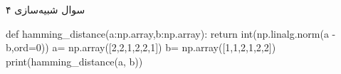سوال شبیه‌سازی ۴

\begin{latin}
\begin{python}
def hamming_distance(a:np.array,b:np.array):
    return int(np.linalg.norm(a - b,ord=0))
a= np.array([2,2,1,2,2,1])
b= np.array([1,1,2,1,2,2])
print(hamming_distance(a, b))
\end{python}
\end{latin}